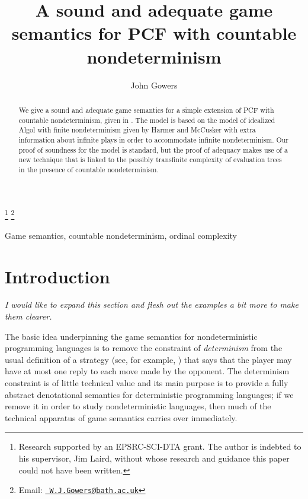 \documentclass{entcs} \usepackage{prentcsmacro}
\newcommand{\0}{{\mathtt{0}}}
\begin{document}
\begin{frontmatter}
  \title{A sound and adequate game semantics for PCF with countable nondeterminism} \author{John
    Gowers}
  \address{Department of Computer Science \\ University of Bath \\
    Bath, United Kingdom} \thanks[ALL]{Research supported by an
    EPSRC-SCI-DTA grant.  The author is indebted to
    his supervisor, Jim Laird, without whose research and guidance
    this paper could not have been written.} \thanks[myemail]{Email:
    \href{mailto:wjg27@bath.ac.uk} {\texttt{\normalshape
        W.J.Gowers@bath.ac.uk}}} 
\begin{abstract} 
  We give a sound and adequate game semantics for a simple extension of PCF with countable nondeterminism, given in \cite{LairdOrdinalGames}.  The model is based on the model of idealized Algol with finite nondeterminism given by Harmer and McCusker \cite{mcCHFiniteND} with extra information about infinite plays in order to accommodate infinite nondeterminism.  Our proof of soundness for the model is standard, but the proof of adequacy makes use of a new technique that is linked to the possibly transfinite complexity of evaluation trees in the presence of countable nondeterminism.
\end{abstract}
\begin{keyword}
  Game semantics, countable nondeterminism, ordinal complexity
\end{keyword}
\end{frontmatter}

\section{Introduction}

{\it I would like to expand this section and flesh out the examples a bit more to make them clearer.}

The basic idea underpinning the game semantics for nondeterministic programming languages is to remove the constraint of \emph{determinism} from the usual definition of a strategy (see, for example, \cite{abramskyjagadeesangames}) that says that the player may have at most one reply to each move made by the opponent.  The determinism constraint is of little technical value and its main purpose is to provide a fully abstract denotational semantics for deterministic programming languages; if we remove it in order to study nondeterministic languages, then much of the technical apparatus of game semantics carries over immediately.  
\end{document}
